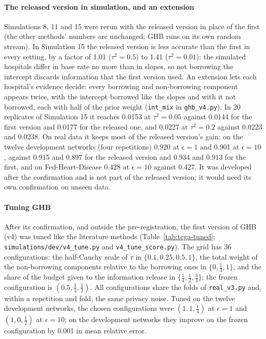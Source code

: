 \documentclass[acmsmall,screen,nonacm]{acmart}
\theoremstyle{acmdefinition}
\begin{document}
\paragraph{The released version in simulation, and an extension} Simulations 8, 11 and 15 were rerun with the released version in place of the first (the other methods' numbers are unchanged; GHB runs on its own random stream). In Simulation 15 the released version is less accurate than the first in every setting, by a factor of 1.01 ($\tau^2=0.5$) to 1.41 ($\tau^2=0.01$): the simulated hospitals differ in base rate no more than in slopes, so not borrowing the intercept discards information that the first version used. An extension lets each hospital's evidence decide: every borrowing and non-borrowing component appears twice, with the intercept borrowed like the slopes and with it not borrowed, each with half of the prior weight (\texttt{int\_mix} in \texttt{ghb\_v4.py}). In 20 replicates of Simulation 15 it reaches 0.0153 at $\tau^2=0.05$ against 0.0144 for the first version and 0.0177 for the released one, and 0.0227 at $\tau^2=0.2$ against 0.0223 and 0.0238. On real data it keeps most of the released version's gain: on the twelve development networks (four repetitions) 0.920 at $\epsilon=1$ and 0.901 at $\epsilon=10$, against 0.915 and 0.897 for the released version and 0.934 and 0.913 for the first, and on Fed-Heart-Disease 0.428 at $\epsilon=10$ against 0.427. It was developed after the confirmation and is not part of the released version; it would need its own confirmation on unseen data.

\paragraph{Tuning GHB} After its confirmation, and outside the pre-registration, the first version of GHB (v4) was tuned like the literature methods (Table~\ref{tab:tcga-tuned}; \texttt{simulations/dev/v4\_tune.py} and \texttt{v4\_tune\_score.py}). The grid has 36 configurations: the half-Cauchy scale of $\tau$ in $\{0.1,0.25,0.5,1\}$, the total weight of the non-borrowing components relative to the borrowing ones in $\{0,\frac13,1\}$, and the share of the budget given to the information release in $\{\frac14,\frac12,\frac34\}$; the frozen configuration is $(0.5,\frac13,\frac12)$. All configurations share the folds of \texttt{real\_v3.py} and, within a repetition and fold, the same privacy noise. Tuned on the twelve development networks, the chosen configurations were $(1,1,\frac14)$ at $\epsilon=1$ and $(1,0,\frac12)$ at $\epsilon=10$; on the development networks they improve on the frozen configuration by 0.001 in mean relative error.
\end{document}
